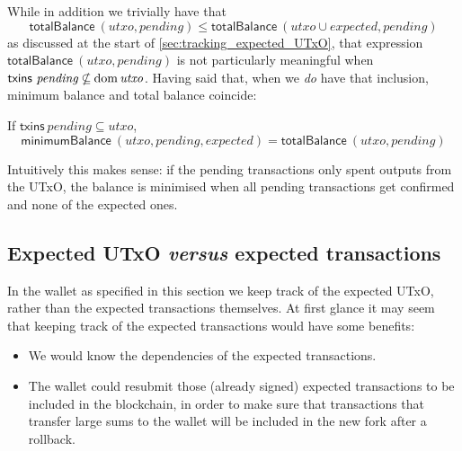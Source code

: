 \documentclass{article}
\DeclareMathOperator{\dom}{dom}
\theoremstyle{definition}{
  \newtheorem{lemma}{Lemma}[section] %
  \newtheorem{definition}[lemma]{Definition}
}
\theoremstyle{theorem}{
  \newtheorem{invariant}[lemma]{Invariant}
  \newtheorem{proofobligation}[lemma]{Proof Obligation}
}
\numberwithin{equation}{lemma}
\begin{document}
While in addition we trivially have that
%
\begin{equation*}
    \mathsf{totalBalance} ~ (\mathit{utxo}, \mathit{pending})
\le \mathsf{totalBalance} ~ (\mathit{utxo} \cup \mathit{expected}, \mathit{pending})
\end{equation*}
%
as discussed at the start of \cref{sec:tracking_expected_UTxO}, that expression
\begin{math}
\mathsf{totalBalance} ~ (\mathit{utxo}, \mathit{pending})
\end{math}
is not particularly meaningful when
\begin{math}
\mathsf{txins} ~ \mathit{pending} \mathbin{\slashed\subseteq} \dom \mathit{utxo}
\end{math}. Having said that, when we \emph{do} have that inclusion, minimum
balance and total balance coincide:
%
\begin{lemma}
If $\mathsf{txins} ~ \mathit{pending} \subseteq \mathit{utxo}$,
\begin{equation*}
  \mathsf{minimumBalance} ~ (\mathit{utxo}, \mathit{pending}, \mathit{expected})
= \mathsf{totalBalance} ~ (\mathit{utxo}, \mathit{pending})
\end{equation*}
\label{lem:minimumBalance_equal_totalBalance}
\end{lemma}
%
Intuitively this makes sense: if the pending transactions only spent outputs
from the UTxO, the balance is minimised when all pending transactions get
confirmed and none of the expected ones.

\subsection{Expected UTxO \emph{versus} expected transactions}

In the wallet as specified in this section we keep track of the expected UTxO,
rather than the expected transactions themselves. At first glance it may seem
that keeping track of the expected transactions would have some benefits:

\begin{itemize}
\item We would know the dependencies of the expected transactions.
\item The wallet could resubmit those (already signed) expected transactions to
be included in the blockchain, in order to make sure that transactions that
transfer large sums to the wallet will be included in the new fork after a
rollback.
\end{itemize}
\end{document}
